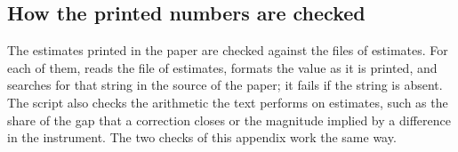 \subsection{How the printed numbers are checked}

The estimates printed in the paper are checked against the files of estimates. For each of them,
 reads the file of estimates,
formats the value as it is printed, and searches for that string in the
source of the paper; it fails if the string is absent. The script also
checks the arithmetic the text performs on estimates, such as the share
of the gap that a correction closes or the magnitude implied by a
difference in the instrument. The two checks of this appendix work the
same way.

